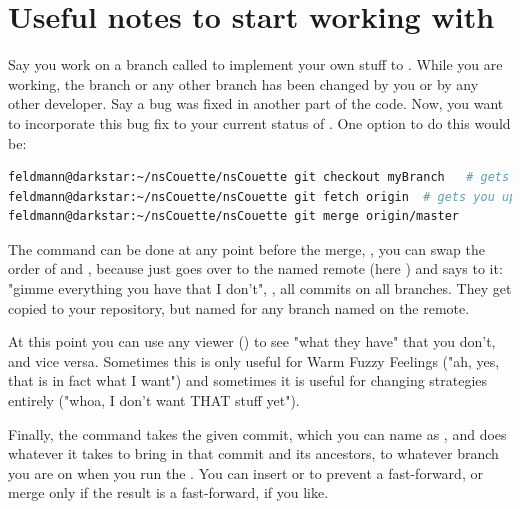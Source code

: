 \documentclass[a4paper, 11pt, DIV=11]{scrartcl}
\begin{document}
\section{Useful notes to start working with }
\label{app:git}
\color{black}
Say you work on a branch called  to implement your own stuff to \nsc.
While you are working, the  branch or any other branch has been changed
by you or by any other developer. Say a bug was fixed in another part of the code.
Now, you want to incorporate this bug fix to your current status of .
One option to do this would be:
\begin{lstlisting}[language=bash]
feldmann@darkstar:~/nsCouette/nsCouette git checkout myBranch   # gets you on your branch
feldmann@darkstar:~/nsCouette/nsCouette git fetch origin  # gets you up to date
feldmann@darkstar:~/nsCouette/nsCouette git merge origin/master
\end{lstlisting}
The  command can be done at any point before the merge, \ie, you can swap the order
of  and , because  just goes over to the named
remote (here ) and says to it: "gimme everything you have that I don't", \ie,
all commits on all branches. They get copied to your repository, but named 
for any branch named  on the remote.
\par
At this point you can use any viewer (\eg {}) to see "what they have" that you don't,
and vice versa. Sometimes this is only useful for Warm Fuzzy Feelings ("ah, yes, that is in fact
what I want") and sometimes it is useful for changing strategies entirely ("whoa, I don't want
THAT stuff yet").
\par
Finally, the  command takes the given commit, which you can name as ,
and does whatever it takes to bring in that commit and its ancestors, to whatever branch you are on
when you run the . You can insert  or  to prevent a
fast-forward, or merge only if the result is a fast-forward, if you like.



\end{document}
